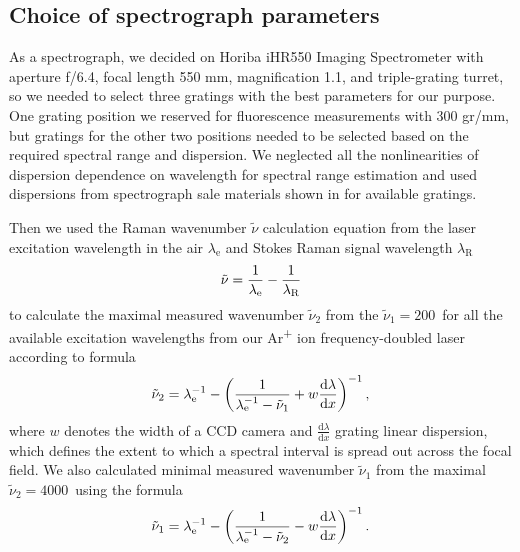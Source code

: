 \subsection{Choice of spectrograph parameters}

As a spectrograph, we decided on Horiba iHR550 Imaging Spectrometer with
aperture f/6.4, focal length 550 mm, magnification 1.1, and triple-grating
turret, so we needed to select three gratings with the best parameters for our
purpose.
One grating position we reserved for fluorescence measurements with 300 gr/mm,
but gratings for the other two positions needed to be selected based on the
required spectral range and dispersion.
We neglected all the nonlinearities of dispersion dependence on wavelength
for spectral range estimation and used dispersions from spectrograph sale
materials shown in
for available gratings.

\begin{table}
	\centering
	
	\caption[%
		Grating dispersion specifications taken from Horiba iHR550
		specification document.%
	]{%
		The linear dispersion
		$\frac{\text{d}\lambda}{\text{d}x}$ defines how a spectral interval is
		spread across the focal field.
	}
	\label{\tablabel{spectrograph_selection:dispersion_spec}}
\end{table}

Then we used the Raman wavenumber $\tilde{\nu}$ calculation equation from
the laser excitation wavelength in the air $\lambda_\text{e}$ and Stokes Raman
signal wavelength $\lambda_\text{R}$
\begin{equation}
	\tilde{\nu} = \frac{1}{\lambda_\text{e}} - \frac{1}{\lambda_\text{R}}
	\label{\eqnlabel{spectrograph_selection:nu}}
\end{equation}
to calculate the maximal measured wavenumber $\tilde{\nu}_2$ from the
$\tilde{\nu}_1 = 200$\,\icm{} for all the available excitation wavelengths
from our Ar\textsuperscript{+} ion frequency-doubled laser according to formula
\begin{equation}
	\tilde{\nu}_2 = \lambda_\text{e}^{-1}
		- \left(\frac{1}{\lambda_\text{e}^{-1} - \tilde{\nu}_1}
			+ w\frac{\text{d}\lambda}{\text{d}x}\right)^{-1},
	\label{\eqnlabel{spectrograph_selection:spectral_range_max_est}}
\end{equation}
where $w$ denotes the width of a CCD camera and
$\frac{\text{d}\lambda}{\text{d}x}$
grating linear dispersion, which defines the extent to which a spectral
interval is spread out across the focal field.
We also calculated minimal measured wavenumber $\tilde{\nu}_1$ from the maximal
$\tilde{\nu}_2 = 4000$\,\icm{} using the formula
\begin{equation}
	\tilde{\nu}_1 = \lambda_\text{e}^{-1}
		- \left(\frac{1}{\lambda_\text{e}^{-1} - \tilde{\nu}_2}
			- w\frac{\text{d}\lambda}{\text{d}x}\right)^{-1}.
	\label{\eqnlabel{spectrograph_selection:spectral_range_min_est}}
\end{equation}

